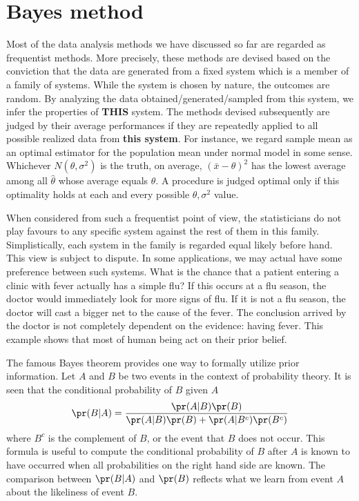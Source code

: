 \chapter{Bayes method}

Most of the data analysis methods we have discussed so far are regarded as
frequentist methods.
More precisely, these methods are devised based on the conviction that the data
are generated from a fixed system which is a member of a family of systems. 
While the system is chosen by nature, the outcomes are 
random. By analyzing the data obtained/generated/sampled from this system, 
we infer the properties of {\bf THIS} system. 
The methods devised subsequently are judged by
their average performances if they are repeatedly applied to 
all possible realized data from {\bf this system}. For instance, we regard sample
mean as an optimal estimator for the population mean under normal model
in some sense.
Whichever $N(\theta, \sigma^2)$ is the truth, on average, $(\bar{x} -\theta)^2$
has the lowest average among all $\hat \theta$ whose average equals $\theta$.
A procedure is judged optimal only if this optimality holds at each and every
possible $\theta, \sigma^2$ value.

When considered from such a frequentist point of view, the statisticians do not
play favours to any specific system against the rest of them in this family.
Simplistically, each system in the family is regarded equal likely before
hand. This view is subject to dispute.
In some applications, we may actual have some preference between
such systems. What is the chance that a patient entering a clinic with fever
actually has a simple flu? If this occurs at a flu season, the doctor would immediately
look for more signs of flu. If it is not a flu season, the doctor will
cast a bigger net to the cause of the fever. The conclusion arrived
by the doctor is not completely dependent on the evidence: having
fever. This example shows that most of human being act on their prior belief.

The famous Bayes theorem provides one way to formally utilize prior
information. Let $A$ and $B$ be two events in the context of probability
theory. It is seen that the conditional probability of $B$ given $A$
\[
\pr (B | A) = \frac{\pr(A|B) \pr(B)}{\pr(A|B) \pr(B) + \pr(A|B^c) \pr(B^c)}
\]
where $B^c$ is the complement of $B$, or the event that $B$ does not occur.
This formula is useful to compute the conditional probability of $B$
after $A$ is known to have occurred when all probabilities on the
right hand side are known.
The comparison between $\pr (B | A) $ and $\pr(B)$ reflects
what we learn from event $A$ about the likeliness of event $B$.

